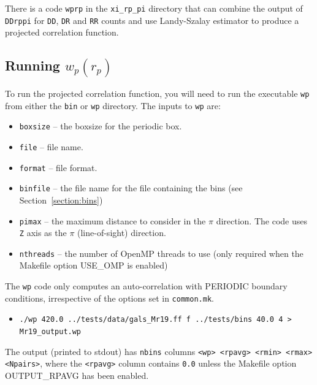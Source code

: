 \documentclass[12pt,titlepage]{article}
\newcommand{\wprp}{\ensuremath{{w_p(r_p)}}\xspace}
\begin{document}
There is a code \texttt{wprp} in the \texttt{xi\_rp\_pi} directory that can combine the output of \texttt{DDrppi} for \texttt{DD}, \texttt{DR} and \texttt{RR} counts 
and use Landy-Szalay estimator to produce a projected correlation function.  

\subsection{Running \texorpdfstring{\wprp}{wp(rp)}}
To run the projected correlation function, you will need to run the executable \texttt{wp} from either the \texttt{bin} or \texttt{wp} directory. The inputs 
to \texttt{wp} are:
\begin{itemize}
\item \texttt{boxsize} -- the boxsize for the periodic box. 
\item \texttt{file}    -- file name.
\item \texttt{format}  -- file format.
\item \texttt{binfile} -- the file name for the file containing the bins (see Section~\ref{section:bins})
\item \texttt{pimax}   -- the maximum distance to consider in the $\pi$ direction. The code uses \texttt{Z} axis as the $\pi$ (line-of-sight) direction. 
\item \texttt{nthreads} -- the number of OpenMP threads to use (only required when the Makefile option USE\_OMP is enabled)
\end{itemize}
The \texttt{wp} code only computes an auto-correlation with PERIODIC boundary conditions, irrespective of the options set in \texttt{common.mk}. 
\begin{itemize}
\item {\scriptsize \texttt{./wp  420.0 ../tests/data/gals\_Mr19.ff f ../tests/bins 40.0 4 > Mr19\_output.wp}}
\end{itemize}
The output (printed to stdout) has \texttt{nbins} columns \texttt{<wp> <rpavg> <rmin> <rmax> <Npairs>}, where the \texttt{<rpavg>} column contains \texttt{0.0} unless the 
Makefile option OUTPUT\_RPAVG has been enabled. 
\end{document}
